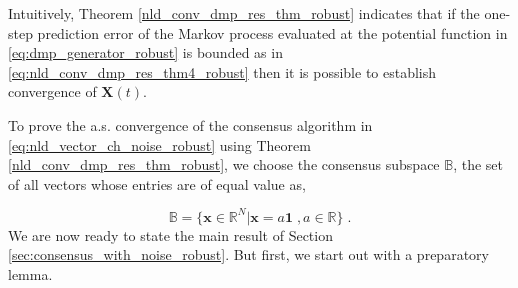 \documentclass[onecolumn, draft, 12pt]{IEEEtran}
\newcommand{\Cs}{\mathbb{B}}
\newcommand{\R}{\mathbb{R}}
\newcommand{\Rn}{\mathbb{R}^{N}}
\newcommand{\onevect}{\mathbf{1}}
\newcommand{\X}{\mathbf{X}}
\newcommand{\xX}{\mathbf{x}}
\begin{document}
Intuitively, Theorem \ref{nld_conv_dmp_res_thm_robust} indicates that if the one-step prediction error of the Markov process evaluated at the potential function in \eqref{eq:dmp_generator_robust} is bounded as in \eqref{eq:nld_conv_dmp_res_thm4_robust} then it is possible to establish convergence of $\X(t)$.

To prove the a.s. convergence of the consensus algorithm in \eqref{eq:nld_vector_ch_noise_robust} using Theorem \ref{nld_conv_dmp_res_thm_robust}, we choose the consensus subspace $\Cs$, the set of all vectors whose entries are of equal value as,

\begin{equation} \label{eq:consensus_subspace}
\Cs=\{ \xX \in \Rn | \xX = a \onevect \;, a \in \R \} \;.
\end{equation}
We are now ready to state the main result of Section \ref{sec:consensus_with_noise_robust}. But first, we start out with a preparatory lemma.
\end{document}
